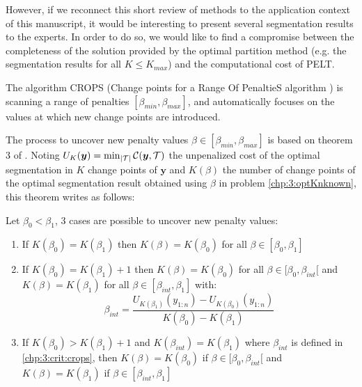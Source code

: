 However, if we reconnect this short review of methods to the application context of this manuscript, it would be interesting to present several segmentation results to the experts. In order to do so, we would like to find a compromise between the completeness of the solution provided by the optimal partition method (e.g. the segmentation results for all $K \leq K_{max}$) and the computational cost of PELT. 

The algorithm CROPS (Change points for a Range Of PenaltieS algorithm \cite{haynes2017}) is scanning a range of penalties $[\beta_{min},\beta_{max}]$, and automatically focuses on the values at which new change points are introduced. 

The process to uncover new penalty values $\beta \in [\beta_{min},\beta_{max}]$ is based on theorem 3 of \cite{haynes2017}. Noting $U_K(\bm y) = \min_{\lvert{\mathcal T}\rvert} {\mathcal C}(\bm y,{\mathcal T})$ the unpenalized cost of the optimal segmentation in $K$ change points of $\bm y$ and $K(\beta)$ the number of change points of the optimal segmentation result obtained using $\beta$ in problem \eqref{chp:3:optKnknown}, this theorem writes as follows:

\begin{theorem}
Let $\beta_0 < \beta_1$, 3 cases are possible to uncover new penalty values:
\begin{enumerate}
  \item If $K(\beta_0) = K(\beta_1)$ then $K(\beta) = K(\beta_0)$ for all $\beta \in [\beta_0,\beta_1]$
  \item If $K(\beta_0) = K(\beta_1)+1$ then $K(\beta) = K(\beta_0)$ for all $\beta\in[\beta_0,\beta_{int}[$ and $K(\beta) = K(\beta_1)$ for all $\beta\in[\beta_{int},\beta_1]$ with:
  \begin{equation}\label{chp:3:crit:crops}
    \beta_{int} = \frac{U_{K(\beta_1)}(y_{1:n})-U_{K(\beta_0)}(y_{1:n})}{K(\beta_0)-K(\beta_1)}
  \end{equation}
  \item If $K(\beta_0) > K(\beta_1)+1$ and $K(\beta_{int}) = K(\beta_1)$ where $\beta_{int}$ is defined in \eqref{chp:3:crit:crops}, then $K(\beta) = K(\beta_0)$ if $\beta\in[\beta_0,\beta_{int}[$ and $K(\beta) = K(\beta_1)$ if $\beta\in [\beta_{int},\beta_1]$
\end{enumerate}
\end{theorem} 

